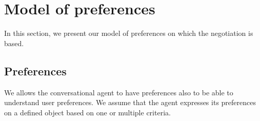 \documentclass{llncs}
\begin{document}
\title{\vskip -10pt}

\maketitle 

\section{Model of preferences}
In this section, we present our model of preferences on which the negotiation is based.
\subsection{Preferences}
\par We allows the conversational agent to have preferences also to be able to understand user preferences. We assume that the agent expresses its preferences on a defined object based on one or multiple criteria.   
\end{document}
